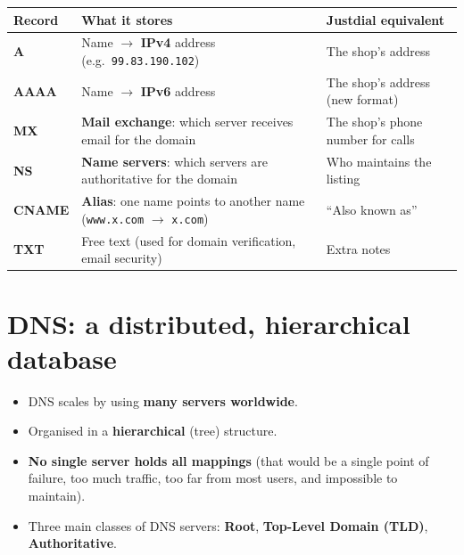 \begin{center}
\begin{tabularx}{\textwidth}{>{\bfseries}l X X}
\toprule
Record & What it stores & Justdial equivalent \\
\midrule
A & Name $\to$ \textbf{IPv4} address (e.g.\ \texttt{99.83.190.102}) & The shop's address \\
AAAA & Name $\to$ \textbf{IPv6} address & The shop's address (new format) \\
MX & \textbf{Mail exchange}: which server receives email for the domain & The shop's phone number for calls \\
NS & \textbf{Name servers}: which servers are authoritative for the domain & Who maintains the listing \\
CNAME & \textbf{Alias}: one name points to another name (\texttt{www.x.com} $\to$ \texttt{x.com}) & ``Also known as'' \\
TXT & Free text (used for domain verification, email security) & Extra notes \\
\bottomrule
\end{tabularx}
\end{center}

\section{DNS: a distributed, hierarchical database}
\begin{itemize}
  \item DNS scales by using \textbf{many servers worldwide}.
  \item Organised in a \textbf{hierarchical} (tree) structure.
  \item \textbf{No single server holds all mappings} (that would be a single point of failure, too much traffic, too far from most users, and impossible to maintain).
  \item Three main classes of DNS servers: \textbf{Root}, \textbf{Top-Level Domain (TLD)}, \textbf{Authoritative}.
\end{itemize}

\begin{center}
\end{center}

